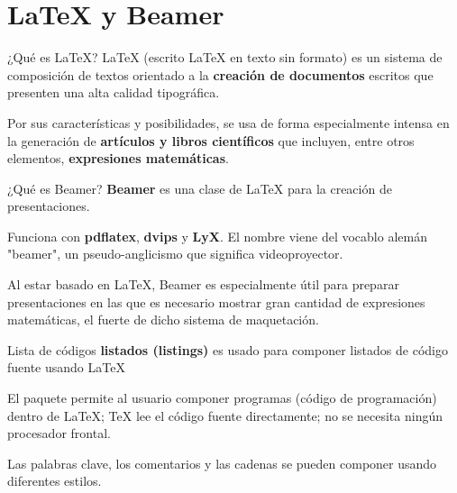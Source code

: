 
\section{\LaTeX{} y Beamer}

\begin{frame}[c]{¿Qué es \LaTeX{}?}
  \LaTeX{} (escrito LaTeX en texto sin formato) es un sistema de composición
  de textos orientado a la \textbf{creación de documentos} escritos que
  presenten una alta calidad tipográfica.

  \vspace{\baselineskip}
  Por sus características y posibilidades, se usa de forma especialmente
  intensa en la generación de \textbf{artículos y libros científicos} que
  incluyen, entre otros elementos, \textbf{expresiones matemáticas}.
\end{frame}

\begin{frame}[c]{¿Qué es Beamer?}
  \textbf{Beamer} es una clase de LaTeX para la creación de presentaciones.

  \vspace{\baselineskip}
  Funciona con \textbf{pdflatex}, \textbf{dvips} y \textbf{LyX}.
  El nombre viene del vocablo alemán "beamer", un pseudo-anglicismo que
  significa videoproyector.

  \vspace{\baselineskip}
  Al estar basado en LaTeX, Beamer es especialmente útil para preparar
  presentaciones en las que es necesario mostrar gran cantidad de expresiones
  matemáticas, el fuerte de dicho sistema de maquetación.
\end{frame}

\begin{frame}[c]{Lista de códigos}
  \textbf{listados (listings)} es usado para componer listados de código
  fuente usando LaTeX

  \vspace{\baselineskip}
  El paquete permite al usuario componer programas (código de programación)
  dentro de LaTeX; TeX lee el código fuente directamente; no se necesita
  ningún procesador frontal.

  \vspace{\baselineskip}
  Las palabras clave, los comentarios y las cadenas se pueden componer
  usando diferentes estilos.
\end{frame}


